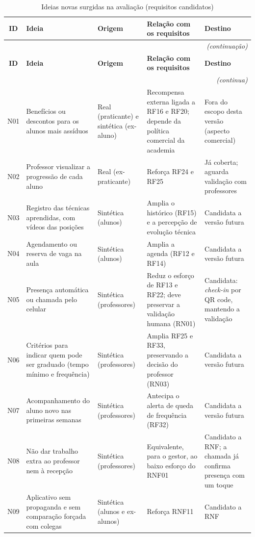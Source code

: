 \begin{quadrolongo}
\begin{longtable}{|c|>{\raggedright\arraybackslash}p{4.0cm}|>{\raggedright\arraybackslash}p{2.1cm}|>{\raggedright\arraybackslash}p{4.0cm}|>{\raggedright\arraybackslash}p{2.6cm}|}
  \caption{Ideias novas surgidas na avaliação (requisitos candidatos)}\label{qua:ideias-novas}\\
  \hline
  \textbf{ID} & \textbf{Ideia} & \textbf{Origem} & \textbf{Relação com os requisitos} & \textbf{Destino} \\ \hline
\endfirsthead
  \multicolumn{5}{r}{\textit{(continuação)}}\\
  \hline
  \textbf{ID} & \textbf{Ideia} & \textbf{Origem} & \textbf{Relação com os requisitos} & \textbf{Destino} \\ \hline
\endhead
  \multicolumn{5}{r}{\textit{(continua)}}\\
\endfoot
\endlastfoot
    N01 & Benefícios ou descontos para os alunos mais assíduos & Real (praticante) e sintética (ex-aluno) & Recompensa externa ligada a RF16 e RF20; depende da política comercial da academia & Fora do escopo desta versão (aspecto comercial) \\ \hline
    N02 & Professor visualizar a progressão de cada aluno & Real (ex-praticante) & Reforça RF24 e RF25 & Já coberta; aguarda validação com professores \\ \hline
    N03 & Registro das técnicas aprendidas, com vídeos das posições & Sintética (alunos) & Amplia o histórico (RF15) e a percepção de evolução técnica & Candidata a versão futura \\ \hline
    N04 & Agendamento ou reserva de vaga na aula & Sintética (alunos) & Amplia a agenda (RF12 e RF14) & Candidata a versão futura \\ \hline
    N05 & Presença automática ou chamada pelo celular & Sintética (professores) & Reduz o esforço de RF13 e RF22; deve preservar a validação humana (RN01) & Candidata: \textit{check-in} por QR code, mantendo a validação \\ \hline
    N06 & Critérios para indicar quem pode ser graduado (tempo mínimo e frequência) & Sintética (professores) & Amplia RF25 e RF33, preservando a decisão do professor (RN03) & Candidata a versão futura \\ \hline
    N07 & Acompanhamento do aluno novo nas primeiras semanas & Sintética (professores) & Antecipa o alerta de queda de frequência (RF32) & Candidata a versão futura \\ \hline
    N08 & Não dar trabalho extra ao professor nem à recepção & Sintética (professores) & Equivalente, para o gestor, ao baixo esforço do RNF01 & Candidato a RNF; a chamada já confirma presença com um toque \\ \hline
    N09 & Aplicativo sem propaganda e sem comparação forçada com colegas & Sintética (alunos e ex-alunos) & Reforça RNF11 & Candidato a RNF \\ \hline
\end{longtable}
\end{quadrolongo}

